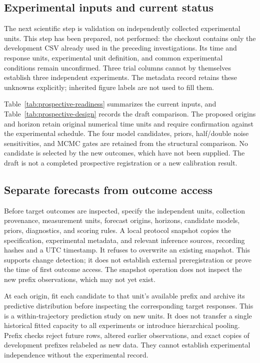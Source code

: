 \subsection{Experimental inputs and current status}

    The next scientific step is validation on independently collected
    experimental units. This step has been prepared, not performed: the
    checkout contains only the development CSV already used in the preceding
    investigations. Its time and response units, experimental unit definition,
    and common experimental conditions remain unconfirmed. Three trial
    columns cannot by themselves establish three independent experiments.
    The metadata record retains these unknowns explicitly; inherited figure
    labels are not used to fill them.

    Table~\ref{tab:prospective-readiness} summarizes the current inputs, and
    Table~\ref{tab:prospective-design} records the draft comparison. The
    proposed origins and horizon retain original numerical time units and
    require confirmation against the experimental schedule. The four model
    candidates, priors, half/double noise sensitivities, and MCMC gates are
    retained from the structural comparison. No candidate is selected by
    the new outcomes, which have not been supplied. The draft is not a
    completed prospective registration or a new calibration result.



\subsection{Separate forecasts from outcome access}

    Before target outcomes are inspected, specify the independent units,
    collection provenance, measurement units, forecast origins, horizons,
    candidate models, priors, diagnostics, and scoring rules. A local
    protocol snapshot copies the specification, experimental metadata, and
    relevant inference sources, recording hashes and a UTC timestamp. It
    refuses to overwrite an existing snapshot. This supports change
    detection; it does not establish external preregistration or prove the
    time of first outcome access. The snapshot operation does not inspect
    the new prefix observations, which may not yet exist.

    At each origin, fit each candidate to that unit's available prefix and
    archive its predictive distribution before inspecting the corresponding
    target responses. This is a within-trajectory prediction study on new
    units. It does not transfer a single historical fitted capacity to all
    experiments or introduce hierarchical pooling. Prefix checks reject
    future rows, altered earlier observations, and exact copies of
    development prefixes relabeled as new data. They cannot establish
    experimental independence without the experimental record.


